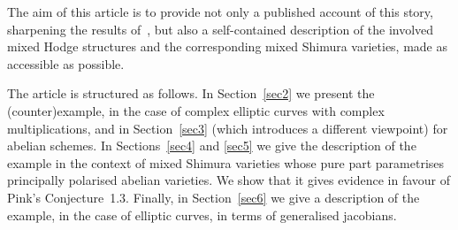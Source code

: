 The aim of this article is to provide not only a published account of
this story, sharpening the results of~\cite{Bertrand11}, but also a
self-contained description of the involved mixed Hodge structures and
the corresponding mixed Shimura varieties, made as accessible as
possible.

The article is structured as follows. In Section~\ref{sec2} we present
the (counter)example, in the case of complex elliptic curves with
complex multiplications, and in Section~\ref{sec3} (which introduces a
different viewpoint) for abelian schemes. In Sections~\ref{sec4} and
\ref{sec5} we give the description of the example in the context of
mixed Shimura varieties whose pure part parametrises principally
polarised abelian varieties. We show that it gives evidence in favour of
Pink's Conjecture~1.3. Finally, in Section~\ref{sec6} we give a description
of the example, in the case of elliptic curves, in terms of
generalised jacobians.

